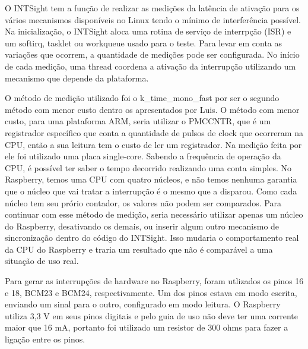 O INTSight tem a função de realizar as medições da latência de ativação para os vários mecanismos disponíveis no Linux tendo o mínimo de interferência possível. Na inicialização, o INTSight aloca uma rotina de serviço de interrpção (ISR) e um softirq, tasklet ou workqueue usado para o teste. Para levar em conta as variações que ocorrem, a quantidade de medições pode ser configurada. No início de cada medição, uma thread coordena a ativação da interrupção utilizando um mecanismo que depende da plataforma. 

O método de medição utilizado foi o k\_time\_mono\_fast por ser o segundo método com menor custo dentro os apresentados por Luis. O método com menor custo, para uma plataforma ARM, seria utilizar o PMCCNTR, que é um registrador específico que conta a quantidade de pulsos de clock que ocorreram na CPU, então a sua leitura tem o custo de ler um registrador. Na medição feita por ele foi utilizado uma placa single-core. Sabendo a frequência de operação da CPU, é possível ter saber o tempo decorrido realizando uma conta simples. No Raspberry, temos uma CPU com quatro núcleos, e não temos nenhuma garantia que o núcleo que vai tratar a interrupção é o mesmo que a disparou. Como cada núcleo tem seu prório contador, os valores não podem ser comparados. Para continuar com esse método de medição, seria necessário utilizar apenas um núcleo do Raspberry, desativando os demais, ou inserir algum outro mecanismo de sincronização dentro do código do INTSight. Isso mudaria o comportamento real da CPU do Raspberry e traria um resultado que não é comparável a uma situação de uso real.


Para gerar as interrupções de hardware no Raspberry, foram utlizados os pinos 16 e 18, BCM23 e BCM24, respectivamente. Um dos pinos estava em modo escrita, enviando um sinal para o outro, configurado em modo leitura. O Raspberry utiliza 3,3 V em seus pinos digitais e pelo guia de uso não deve ter uma corrente maior que 16 mA, portanto foi utilizado um resistor de 300 ohms para fazer a ligação entre os pinos.